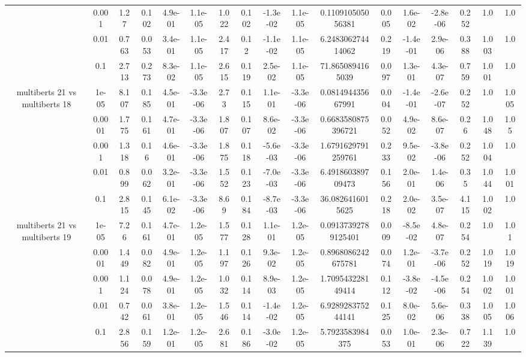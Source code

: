 \begin{tabular}{|c|c|c|c|c|c|c|c|c|c|c|c|c|c|c|c|c|}
 & 0.001 & 1.27 & 0.102 & 4.9e-01 & 1.1e-05 & 1.022 & 0.102 & -1.3e-02 & 1.1e-05 & 0.110910505056381 & 0.005 & 1.6e-02 & -2.8e-06 & 0.252 & 1.0 & 1.0 \\
 & 0.01 & 0.763 & 0.053 & 3.4e-01 & 1.1e-05 & 2.417 & 0.12 & -1.1e-02 & 1.1e-05 & 6.248306274414062 & 0.219 & -1.4e-01 & 2.9e-06 & 0.388 & 1.003 & 1.0 \\
 & 0.1 & 2.713 & 0.273 & 8.3e-02 & 1.1e-05 & 2.615 & 0.119 & 2.5e-02 & 1.1e-05 & 71.8650894165039 & 0.097 & 1.3e-01 & 4.3e-07 & 0.759 & 1.001 & 1.0 \\
\hline
\multirow{5}{*}{multiberts 21 vs multiberts 18} & 1e-05 & 8.107 & 0.185 & 4.5e-01 & -3.3e-06 & 2.73 & 0.115 & 1.1e-01 & -3.3e-06 & 0.081494435667991 & 0.004 & -1.4e-01 & -2.6e-07 & 0.252 & 1.0 & 1.005 \\
 & 0.0001 & 1.775 & 0.161 & 4.7e-01 & -3.3e-06 & 1.807 & 0.107 & 8.6e-02 & -3.3e-06 & 0.6683580875396721 & 0.052 & 4.9e-02 & 8.6e-07 & 0.26 & 1.048 & 1.05 \\
 & 0.001 & 1.318 & 0.16 & 4.6e-01 & -3.3e-06 & 1.875 & 0.118 & -5.6e-03 & -3.3e-06 & 1.6791629791259761 & 0.233 & 9.5e-02 & -3.8e-06 & 0.252 & 1.004 & 1.0 \\
 & 0.01 & 0.899 & 0.062 & 3.2e-01 & -3.3e-06 & 1.552 & 0.123 & -7.0e-03 & -3.3e-06 & 6.491860389709473 & 0.156 & 2.0e-01 & 1.4e-06 & 0.35 & 1.044 & 1.001 \\
 & 0.1 & 2.815 & 0.145 & 6.1e-02 & -3.3e-06 & 8.69 & 0.184 & -8.7e-03 & -3.3e-06 & 36.0826416015625 & 0.218 & 2.0e-02 & 3.5e-07 & 4.115 & 1.002 & 1.0 \\
\hline
\multirow{5}{*}{multiberts 21 vs multiberts 19} & 1e-05 & 7.26 & 0.161 & 4.7e-01 & 1.2e-05 & 1.577 & 0.128 & 1.1e-01 & 1.2e-05 & 0.09137392789125401 & 0.009 & -8.5e-02 & 4.8e-07 & 0.254 & 1.0 & 1.01 \\
 & 0.0001 & 1.449 & 0.082 & 4.9e-01 & 1.2e-05 & 1.197 & 0.126 & 9.3e-02 & 1.2e-05 & 0.8968086242675781 & 0.074 & 1.2e-01 & -3.7e-06 & 0.252 & 1.019 & 1.019 \\
 & 0.001 & 1.124 & 0.078 & 4.9e-01 & 1.2e-05 & 1.032 & 0.114 & 8.9e-03 & 1.2e-05 & 1.709543228149414 & 0.112 & -3.8e-02 & -4.5e-06 & 0.254 & 1.002 & 1.001 \\
 & 0.01 & 0.742 & 0.061 & 3.8e-01 & 1.2e-05 & 1.546 & 0.114 & -1.4e-02 & 1.2e-05 & 6.928928375244141 & 0.125 & 8.0e-02 & 5.6e-06 & 0.338 & 1.005 & 1.006 \\
 & 0.1 & 2.856 & 0.159 & 1.2e-01 & 1.2e-05 & 2.681 & 0.186 & -3.0e-02 & 1.2e-05 & 5.7923583984375 & 0.053 & 1.0e-01 & 2.3e-06 & 0.722 & 1.139 & 1.0 \\

\end{tabular}
